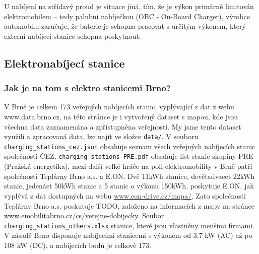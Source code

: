 \documentclass[a4paper,11pt]{article}
\begin{document}
U nabíjení na střídavý proud je situace jiná, tím, že je výkon primárně limitován elektromobilem -- tedy palubní nabíječkou 
(OBC - On-Board Charger), výrobce automobilu zaručuje, že baterie je schopna pracovat s určitým výkonem, který externí
nabíjecí stanice schopna poskytnout. %

\subsection{Elektronabíjecí stanice}

\subsubsection{Jak je na tom s elektro stanicemi Brno?}
\label{sec:stanice}
V Brně je celkem 173 veřejných nabíjecích stanic, vyplývající z dat z webu www.data.brno.cz\cite{data_brno},
na této stránce je i vytvořený dataset s mapou, kde jsou všechna data zaznamenána a zpřístupněna veřejnosti.
My jsme tento dataset využili a zpracovaná data, lze najít ve složce \texttt{data/}. V souboru \texttt{charging\_stations\_cez.json}
obsahuje seznam všech veřejných nabíjecích stanic společnosti ČEZ, \texttt{charging\_stations\_PRE.pdf} obsahuje
list stanic skupiny PRE (Pražská energetika), mezi další velké hráče na poli elektromobility v Brně patří společnosti
Teplárny Brno a.s. a E.ON. Dvě 11kWh stanice, devětadvacet 22kWh stanic, jedenáct 50kWh stanic a 5 stanic o výkonu 150kWh, 
poskytuje E.ON, jak vyplývá z dat dostupných na webu \href{https://www.eon-drive.cz/mapa/}{www.eon-drive.cz/mapa/}.
Zato společnosti Teplárny Brno a.s. poskutuje TODO, založeno na informacích z mapy na stránce 
\href{https://www.emobilitabrno.cz/cs/verejne-dobijecky}{www.emobilitabrno.cz/cs/verejne-dobijecky}.
Soubor \texttt{charging\_stations\_others.xlsx} stanice, které jsou vlastněny menšími firmami.
V zásadě Brno disponuje nabíjecími stanicemi s výkonem od 3.7 kW (AC) až po 108 kW (DC), a nabíjecích bodů je 
celkově 173. \cite{eon_data, emobilita_data}

\end{document}
